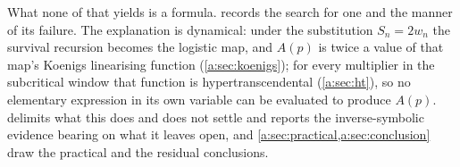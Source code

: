 What none of that yields is a formula.  records the search for one
and the manner of its failure. The explanation is dynamical: under the
substitution $S_n = 2w_n$ the survival
recursion becomes the logistic map, and $A(p)$ is twice a value of that map's
Koenigs linearising function (\cref{a:sec:koenigs}); for every multiplier in the
subcritical window that function is hypertranscendental (\cref{a:sec:ht}), so no
elementary expression in its own variable can be evaluated to produce $A(p)$.
 delimits what this does and does not settle and reports the
inverse-symbolic evidence bearing on what it leaves open, and
\cref{a:sec:practical,a:sec:conclusion} draw the practical and the residual
conclusions.
